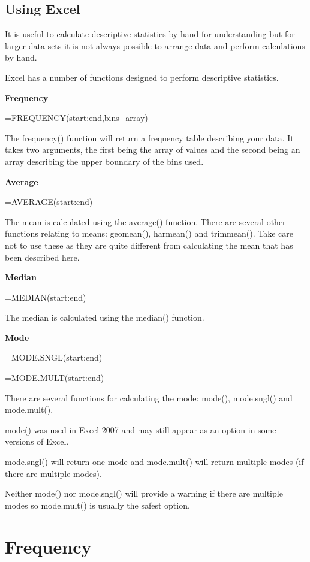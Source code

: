 \documentclass[
]{book}
\begin{document}
\hypertarget{using-excel}{%
\subsection{Using Excel}\label{using-excel}}

It is useful to calculate descriptive statistics by hand for understanding but for larger data sets it is not always possible to arrange data and perform calculations by hand.

Excel has a number of functions designed to perform descriptive statistics.

\textbf{Frequency}

=FREQUENCY(start:end,bins\_array)

The frequency() function will return a frequency table describing your data. It takes two arguments, the first being the array of values and the second being an array describing the upper boundary of the bins used.

\textbf{Average}

=AVERAGE(start:end)

The mean is calculated using the average() function. There are several other functions relating to means: geomean(), harmean() and trimmean(). Take care not to use these as they are quite different from calculating the mean that has been described here.

\textbf{Median}

=MEDIAN(start:end)

The median is calculated using the median() function.

\textbf{Mode}

=MODE.SNGL(start:end)

=MODE.MULT(start:end)

There are several functions for calculating the mode: mode(), mode.sngl() and mode.mult().

mode() was used in Excel 2007 and may still appear as an option in some versions of Excel.

mode.sngl() will return one mode and mode.mult() will return multiple modes (if there are multiple modes).

Neither mode() nor mode.sngl() will provide a warning if there are multiple modes so mode.mult() is usually the safest option.

\hypertarget{frequency}{%
\section{Frequency}\label{frequency}}
\end{document}
